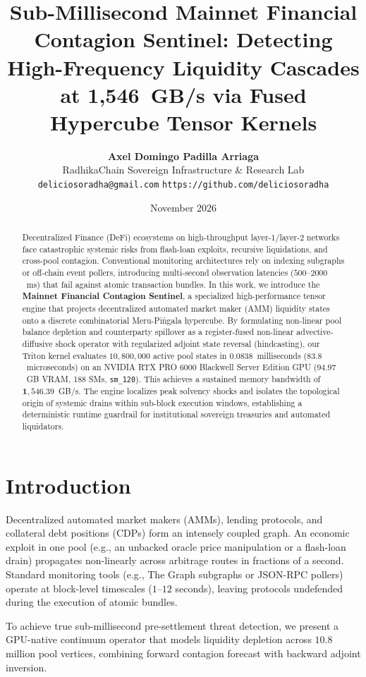 \documentclass[10pt,twocolumn]{article}
\title{\textbf{Sub-Millisecond Mainnet Financial Contagion Sentinel: Detecting High-Frequency Liquidity Cascades at 1,546~GB/s via Fused Hypercube Tensor Kernels}}
\author{
    \textbf{Axel Domingo Padilla Arriaga}\\
    RadhikaChain Sovereign Infrastructure \& Research Lab\\
    \texttt{deliciosoradha@gmail.com} \quad \texttt{https://github.com/deliciosoradha}
}
\date{November 2026}
\begin{document}
\maketitle

\begin{abstract}
Decentralized Finance (DeFi) ecosystems on high-throughput layer-1/layer-2 networks face catastrophic systemic risks from flash-loan exploits, recursive liquidations, and cross-pool contagion. Conventional monitoring architectures rely on indexing subgraphs or off-chain event pollers, introducing multi-second observation latencies ($500$--$2000$~ms) that fail against atomic transaction bundles. In this work, we introduce the \textbf{Mainnet Financial Contagion Sentinel}, a specialized high-performance tensor engine that projects decentralized automated market maker (AMM) liquidity states onto a discrete combinatorial Meru-Pi\.{n}gala hypercube. By formulating non-linear pool balance depletion and counterparty spillover as a register-fused non-linear advective-diffusive shock operator with regularized adjoint state reversal (hindcasting), our Triton kernel evaluates $10,800,000$ active pool states in $\mathbf{0.0838}$~milliseconds ($\mathbf{83.8}$~microseconds) on an NVIDIA RTX PRO 6000 Blackwell Server Edition GPU ($94.97$~GB VRAM, 188 SMs, \texttt{sm\_120}). This achieves a sustained memory bandwidth of $\mathbf{1,546.39}$~GB/s. The engine localizes peak solvency shocks and isolates the topological origin of systemic drains within sub-block execution windows, establishing a deterministic runtime guardrail for institutional sovereign treasuries and automated liquidators.
\end{abstract}

\section{Introduction}
Decentralized automated market makers (AMMs), lending protocols, and collateral debt positions (CDPs) form an intensely coupled graph. An economic exploit in one pool (e.g., an unbacked oracle price manipulation or a flash-loan drain) propagates non-linearly across arbitrage routes in fractions of a second. Standard monitoring tools (e.g., The Graph subgraphs or JSON-RPC pollers) operate at block-level timescales ($1$--$12$ seconds), leaving protocols undefended during the execution of atomic bundles.

To achieve true sub-millisecond pre-settlement threat detection, we present a GPU-native continuum operator that models liquidity depletion across $10.8$ million pool vertices, combining forward contagion forecast with backward adjoint inversion.
\end{document}
